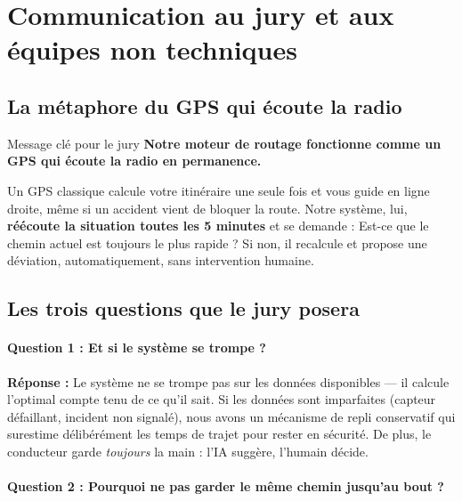 \documentclass[12pt,a4paper]{article}
\theoremstyle{definition}
\theoremstyle{remark}
\begin{document}
\newpage

\section{Communication au jury et aux équipes non techniques}

\subsection{La métaphore du GPS qui écoute la radio}

\begin{jurybox}{Message clé pour le jury}
  \textbf{Notre moteur de routage fonctionne comme un GPS
  qui écoute la radio en permanence.}

  \medskip
  Un GPS classique calcule votre itinéraire une seule fois
  et vous guide en ligne droite, même si un accident vient de bloquer
  la route. Notre système, lui, \textbf{réécoute la situation toutes
  les 5 minutes} et se demande : \og{}Est-ce que le chemin actuel
  est toujours le plus rapide ?\fg{} Si non, il recalcule et propose
  une déviation, automatiquement, sans intervention humaine.
\end{jurybox}

\subsection{Les trois questions que le jury posera}

\paragraph{Question 1 : \og{}Et si le système se trompe ?\fg{}}

\noindent\textbf{Réponse :} Le système ne se trompe pas sur les données
disponibles — il calcule l'optimal compte tenu de ce qu'il sait. Si les
données sont imparfaites (capteur défaillant, incident non signalé), nous
avons un mécanisme de repli conservatif qui surestime délibérément les
temps de trajet pour rester en sécurité. De plus, le conducteur garde
\emph{toujours} la main : l'IA suggère, l'humain décide.

\paragraph{Question 2 : \og{}Pourquoi ne pas garder le même chemin jusqu'au bout ?\fg{}}
\end{document}
